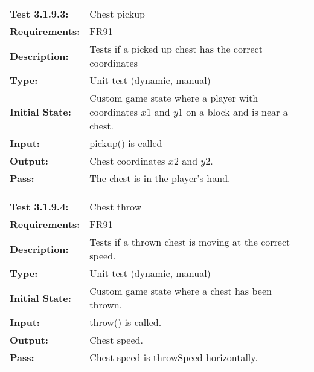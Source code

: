 \documentclass[12pt, titlepage]{article}
\begin{document}
\textcolor{red}{
\begin{tabular}{|l|p{10cm}|}
    \hline
    \bf{Test} 3.1.9.3: & Chest pickup \\
    \bf{Requirements}: & FR91 \\
    \bf{Description}: &  Tests if a picked up chest has the correct coordinates \\
    \bf{Type}: & Unit test (dynamic, manual) \\
    \bf{Initial State}: & Custom game state where a player with coordinates $x1$ and $y1$ on a block and is near a chest. \\
    \bf{Input}: & pickup() is called \\
    \bf{Output}: & Chest coordinates $x2$ and $y2$. \\
    \bf{Pass}: & The chest is in the player's hand. \\
    \hline
\end{tabular}
}

\textcolor{red}{
\begin{tabular}{|l|p{10cm}|}
    \hline
    \bf{Test} 3.1.9.4: & Chest throw \\
    \bf{Requirements}: & FR91 \\
    \bf{Description}: & Tests if a thrown chest is moving at the correct speed. \\
    \bf{Type}: & Unit test (dynamic, manual) \\
    \bf{Initial State}: & Custom game state where a chest has been thrown. \\
    \bf{Input}: & throw() is called. \\
    \bf{Output}: & Chest speed. \\
    \bf{Pass}: & Chest speed is throwSpeed horizontally. \\
    \hline
\end{tabular}
}
\end{document}
